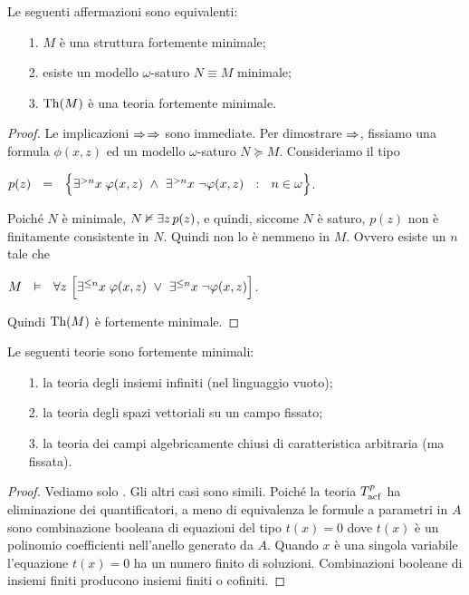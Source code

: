 \begin{theorem}\label{fmequivalenzadefinizioni}
Le seguenti affermazioni sono equivalenti:
\begin{itemize}
\item[1.] $M$ \`e una struttura fortemente minimale;
\item[2.] esiste un modello $\omega$-saturo $N\equiv M$ minimale;
\item[3.] $\textrm{Th}(M)$ \`e una teoria fortemente minimale.
\end{itemize}
\end{theorem}
\begin{proof}
Le implicazioni $\Rightarrow$$\Rightarrow$ sono immediate. Per dimostrare $\Rightarrow$, fissiamo una formula $\phi(x,z)$ ed un modello $\omega$-saturo $N\succeq M$. Consideriamo il tipo 

\hfil$p(z)\ \ =\ \ \Big\{ \E^{> n}x\;\phi(x,z)\ \wedge\ \E^{> n}x\;\neg\phi(x,z) \ \ :\ \ n\in\omega\Big\}$.

Poich\'e $N$ \`e minimale, $N\nvDash \exists z\,p(z)$, e quindi, siccome $N$ \`e saturo, $p(z)$ non \`e finitamente consistente in $N$. Quindi non lo \`e nemmeno in $M$. Ovvero esiste un $n$ tale che

\hfil$M\ \ \vDash\ \  \forall z\ \Big[\exists^{\le n}x\;\varphi(x,z)\ \vee\ \exists^{\le n}x\;\neg\varphi(x,z)\Big]$.

Quindi $\textrm{Th}(M)$ \`e fortemente minimale.
\end{proof}

\begin{theorem}\label{esempism}
Le seguenti teorie sono fortemente minimali:
\begin{itemize}
\item[1.] la teoria degli insiemi infiniti (nel linguaggio vuoto);
\item[2.] la teoria degli spazi vettoriali su un campo fissato;
\item[3.] la teoria dei campi algebricamente chiusi di caratteristica arbitraria (ma fissata).
\end{itemize}
\end{theorem}
\begin{proof}
Vediamo solo . Gli altri casi sono simili. Poich\'e la teoria  $T^p_{\rm acf}$ ha eliminazione dei quantificatori, a meno di equivalenza le formule a parametri in $A$ sono combinazione booleana di equazioni del tipo $t(x)=0$ dove $t(x)$ \`e un polinomio coefficienti nell'anello generato da $A$. Quando $x$ \`e una singola variabile l'equazione $t(x)=0$ ha un numero finito di soluzioni. Combinazioni booleane di insiemi finiti producono insiemi finiti o cofiniti.  
\end{proof}


